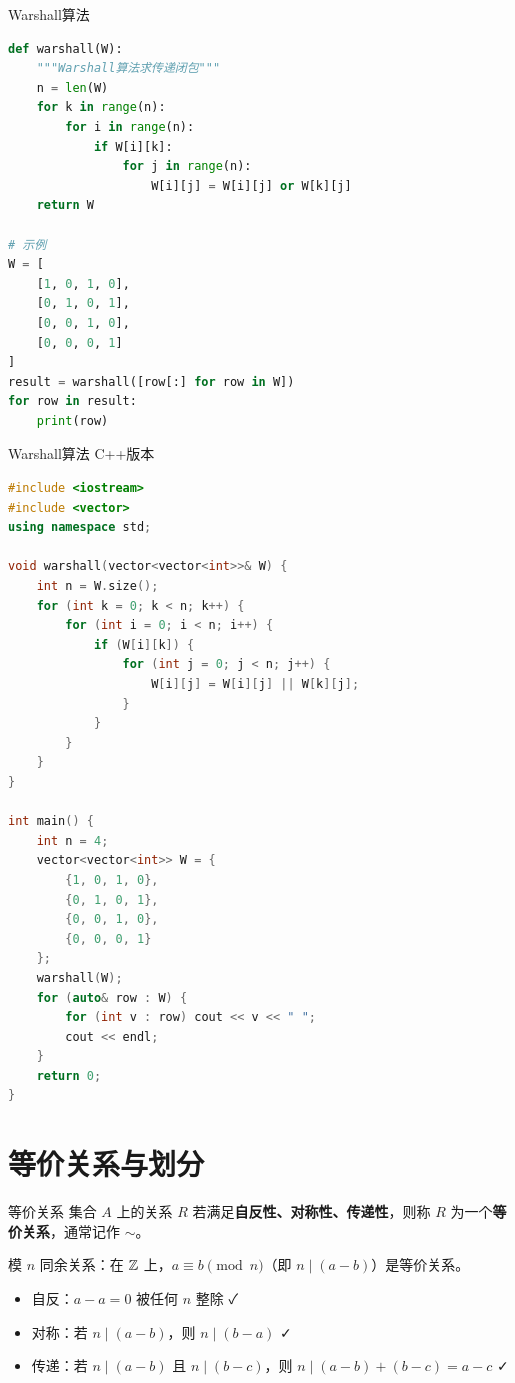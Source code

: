 \begin{mycode}{Warshall算法}
\begin{lstlisting}[language=Python]
def warshall(W):
    """Warshall算法求传递闭包"""
    n = len(W)
    for k in range(n):
        for i in range(n):
            if W[i][k]:
                for j in range(n):
                    W[i][j] = W[i][j] or W[k][j]
    return W

# 示例
W = [
    [1, 0, 1, 0],
    [0, 1, 0, 1],
    [0, 0, 1, 0],
    [0, 0, 0, 1]
]
result = warshall([row[:] for row in W])
for row in result:
    print(row)
\end{lstlisting}
\end{mycode}

\begin{mycode}{Warshall算法 C++版本}
\begin{lstlisting}[language=C++]
#include <iostream>
#include <vector>
using namespace std;

void warshall(vector<vector<int>>& W) {
    int n = W.size();
    for (int k = 0; k < n; k++) {
        for (int i = 0; i < n; i++) {
            if (W[i][k]) {
                for (int j = 0; j < n; j++) {
                    W[i][j] = W[i][j] || W[k][j];
                }
            }
        }
    }
}

int main() {
    int n = 4;
    vector<vector<int>> W = {
        {1, 0, 1, 0},
        {0, 1, 0, 1},
        {0, 0, 1, 0},
        {0, 0, 0, 1}
    };
    warshall(W);
    for (auto& row : W) {
        for (int v : row) cout << v << " ";
        cout << endl;
    }
    return 0;
}
\end{lstlisting}
\end{mycode}

\section{等价关系与划分}

\begin{mydefinition}{等价关系}
集合 $A$ 上的关系 $R$ 若满足\textbf{自反性、对称性、传递性}，则称 $R$ 为一个\textbf{等价关系}，通常记作 $\sim$。
\end{mydefinition}

\begin{example}
模 $n$ 同余关系：在 $\mathbb{Z}$ 上，$a \equiv b \pmod{n}$（即 $n \mid (a-b)$）是等价关系。
\begin{itemize}
\item 自反：$a-a=0$ 被任何 $n$ 整除 ✓
\item 对称：若 $n \mid (a-b)$，则 $n \mid (b-a)$ ✓
\item 传递：若 $n \mid (a-b)$ 且 $n \mid (b-c)$，则 $n \mid (a-b)+(b-c) = a-c$ ✓
\end{itemize}
\end{example}

